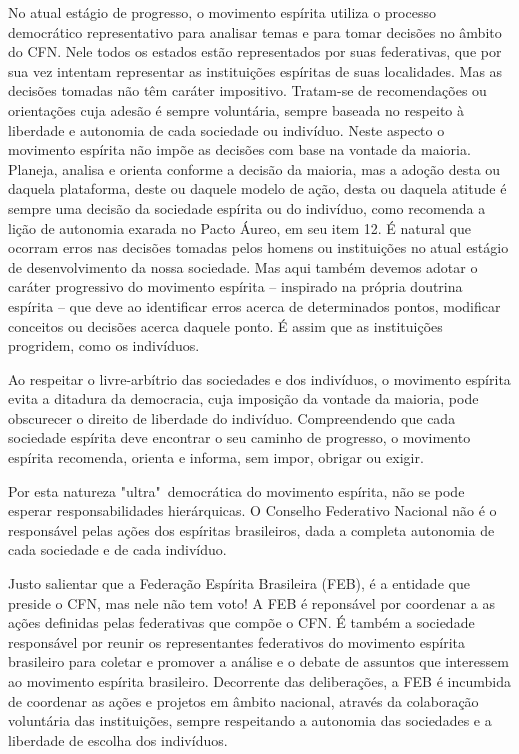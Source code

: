 No atual estágio de progresso, o movimento espírita utiliza o processo democrático representativo para analisar temas e para tomar decisões no âmbito do CFN. Nele todos os estados estão representados por suas federativas, que por sua vez intentam representar as instituições espíritas de suas localidades. Mas as decisões tomadas não têm caráter impositivo. Tratam-se de recomendações ou orientações cuja adesão é sempre voluntária, sempre baseada no respeito à liberdade e autonomia de cada sociedade ou indivíduo. Neste aspecto o movimento espírita não impõe as decisões com base na vontade da maioria. Planeja, analisa e orienta conforme a decisão da maioria, mas a adoção desta ou daquela plataforma, deste ou daquele modelo de ação, desta ou daquela atitude é sempre uma decisão da sociedade espírita ou do indivíduo, como recomenda a lição de autonomia exarada no Pacto Áureo, em seu item 12. É natural que ocorram erros nas decisões tomadas pelos homens ou instituições no atual estágio de desenvolvimento da nossa sociedade. Mas aqui também devemos adotar o caráter progressivo do movimento espírita -- inspirado na própria doutrina espírita -- que deve ao identificar erros acerca de determinados pontos, modificar conceitos ou decisões acerca daquele ponto. É assim que as instituições progridem, como os indivíduos. 

Ao respeitar o livre-arbítrio das sociedades e dos indivíduos, o movimento espírita evita a ditadura da democracia, cuja imposição da vontade da maioria, pode obscurecer o direito de liberdade do indivíduo. Compreendendo que cada sociedade espírita deve encontrar o seu caminho de progresso, o movimento espírita recomenda, orienta e informa, sem impor, obrigar ou exigir. 

Por esta natureza "ultra"\ democrática do movimento espírita, não se pode esperar responsabilidades hierárquicas. O Conselho Federativo Nacional não é o responsável pelas ações dos espíritas brasileiros, dada a completa autonomia de cada sociedade e de cada indivíduo. 

Justo salientar que a Federação Espírita Brasileira (FEB), é a entidade que preside o CFN, mas nele não tem voto! A FEB é reponsável por coordenar a as ações definidas pelas federativas que compõe o CFN. É também a sociedade responsável por reunir os representantes federativos do movimento espírita brasileiro para coletar e promover a análise e o debate de assuntos que interessem ao movimento espírita brasileiro. Decorrente das deliberações, a FEB é incumbida de coordenar as ações e projetos em âmbito nacional, através da colaboração voluntária das instituições, sempre respeitando a autonomia das sociedades e a liberdade de escolha dos indivíduos. 

